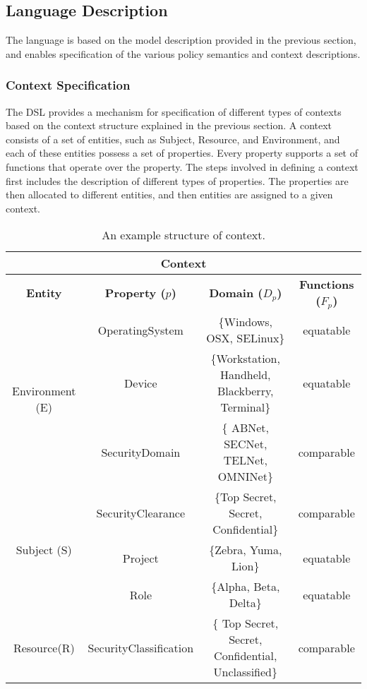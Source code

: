 \subsection{Language Description}
The language is based on the model description provided in the previous section, and enables specification of the various policy semantics and context descriptions. 

\subsubsection{Context Specification}
The DSL provides a mechanism for specification of different types of contexts based on the context structure explained in the previous section. A context consists of a set of entities, such as Subject, Resource, and Environment, and each of these entities possess a set of properties. Every property supports a set of functions that operate over the property. The steps involved in defining a context first includes the description of different types of properties. The properties are then allocated to different entities, and then entities are assigned to a given context. 

\begin{table*}[t]
\caption{An example structure of context.}
\label{table:context}
\begin{center}
\begin{tabular}{|c|c|c|c|}
\hline
\multicolumn{4}{|c|}{ \bf Context}\\
\hline
{ \bf Entity} & {\bf Property ($p$)} & { \bf Domain ($D_p$)} & {\bf Functions ($F_p$)}\\
\hline
\multirow{3}{*}{Environment (E)} & OperatingSystem & \{Windows, OSX, SELinux\}&  equatable\\
                                                    & Device & \{Workstation, Handheld, Blackberry, Terminal\} & equatable \\
                                                    & SecurityDomain & \{ ABNet, SECNet, TELNet, OMNINet\} & comparable\\ 
\hline
\multirow{3}{*}{Subject (S)} & SecurityClearance & \{Top Secret, Secret, Confidential\} &  comparable\\
				      &Project & \{Zebra, Yuma, Lion\} & equatable\\
				       &Role & \{Alpha, Beta, Delta\} & equatable\\

\hline
 Resource(R) & SecurityClassification & \{ Top Secret, Secret, Confidential, Unclassified\} & comparable \\
\hline

\end{tabular}
\end{center}
\label{default}
\end{table*} 

